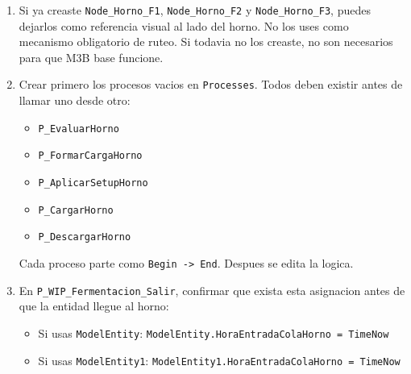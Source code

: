\documentclass[11pt]{article}
\newcommand{\simio}[1]{\texttt{#1}}
\newcommand{\state}[1]{\texttt{#1}}
\newcommand{\proc}[1]{\texttt{#1}}
\begin{document}
\begin{enumerate}
  \item Si ya creaste \simio{Node\_Horno\_F1}, \simio{Node\_Horno\_F2} y \simio{Node\_Horno\_F3}, puedes dejarlos como referencia visual al lado del horno. No los uses como mecanismo obligatorio de ruteo. Si todavia no los creaste, no son necesarios para que M3B base funcione.

  \item Crear primero los procesos vacios en \simio{Processes}. Todos deben existir antes de llamar uno desde otro:
  \begin{itemize}
    \item \proc{P\_EvaluarHorno}
    \item \proc{P\_FormarCargaHorno}
    \item \proc{P\_AplicarSetupHorno}
    \item \proc{P\_CargarHorno}
    \item \proc{P\_DescargarHorno}
  \end{itemize}
  Cada proceso parte como \simio{Begin -> End}. Despues se edita la logica.

  \item En \proc{P\_WIP\_Fermentacion\_Salir}, confirmar que exista esta asignacion antes de que la entidad llegue al horno:
  \begin{itemize}
    \item Si usas \simio{ModelEntity}: \state{ModelEntity.HoraEntradaColaHorno = TimeNow}
    \item Si usas \simio{ModelEntity1}: \state{ModelEntity1.HoraEntradaColaHorno = TimeNow}
  \end{itemize}


\end{enumerate}
\end{document}
